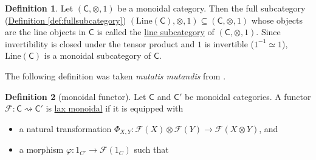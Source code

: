 \documentclass[a4paper]{report}
\newcommand{\defn}[1]{\ul{#1}}
\newcommand{\Line}{\mathrm{Line}}
\theoremstyle{definition}
\newtheorem{definition}{Definition}[section]
\theoremstyle{plain}
\theoremstyle{remark}
\begin{document}
\begin{definition}
  Let $(\mathsf{C}, \otimes, 1)$ be a monoidal category. Then the full subcategory (\hyperref[def:fullsubcategory]{Definition \ref*{def:fullsubcategory}}) $(\Line(\mathsf{C}), \otimes, 1) \subseteq (\mathsf{C}, \otimes, 1)$ whose objects are the line objects in $\mathsf{C}$ is called the \defn{line subcategory} of $(\mathsf{C}, \otimes, 1)$. Since invertibility is closed under the tensor product and $1$ is invertible ($1^{-1} \simeq 1$), $\mathrm{Line}(\mathsf{C})$ is a monoidal subcategory of $\mathsf{C}$.
\end{definition}

The following definition was taken \emph{mutatis mutandis} from \cite{baez-definitions-everyone-should-know}. 
\begin{definition}[monoidal functor]
  \label{def:monoidalfunctor}
  Let $\mathsf{C}$ and $\mathsf{C}'$ be monoidal categories. A functor $\mathcal{F}\colon \mathsf{C} \rightsquigarrow \mathsf{C}'$ is \defn{lax monoidal} if it is equipped with
  \begin{itemize}
    \item a natural transformation $\Phi_{X, Y}\colon \mathcal{F}(X) \otimes \mathcal{F}(Y) \to \mathcal{F}(X \otimes Y)$, and

    \item a morphism $\varphi\colon 1_{C'} \to \mathcal{F}(1_{C})$ such that


\end{itemize}
\end{definition}
\end{document}
